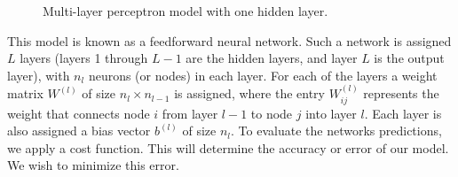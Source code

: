\documentclass[aps,reprint,superscriptaddress,nofootinbib]{revtex4-2}
\begin{document}
\begin{figure}[htp]
{
        }
        \caption{Multi-layer perceptron model with one hidden layer.}
        \label{fig:multi_percep}
    \end{figure}
This model is known as a feedforward neural network. Such a network is assigned $L$ layers (layers 1 through \(L-1\) are the hidden layers, and layer \(L\) is the output layer), with \(n_{l}\) neurons (or nodes) in each layer. For each of the layers a weight matrix \(W^{(l)}\) of size \(n_{l} \times n_{l-1}\) is assigned, where the entry \(W^{(l)}_{ij}\) represents the weight that connects node \(i\) from layer \(l-1\) to node \(j\) into layer \(l\). Each layer is also assigned a bias vector \(b^{(l)}\) of size \(n_{l}\). To evaluate the networks predictions, we apply a cost function. This will determine the accuracy or error of our model. We wish to minimize this error. 

\end{document}
